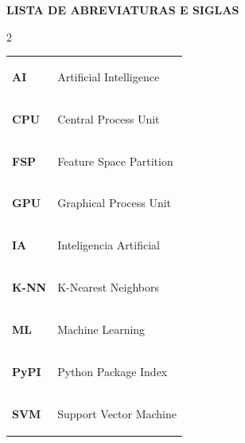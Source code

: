 \newpage
\thispagestyle{empty}
\begin{center}
\textbf{\uppercase{Lista de Abreviaturas e Siglas}}
\end{center}
\vspace{0.5cm}

\begin{spacing}{2}

\begin{longtable}[l]{ l l }
\hypertarget{sigla:AI}{\textbf{AI}}&Artificial Intelligence\\
\hypertarget{sigla:CPU}{\textbf{CPU}}&Central Process Unit\\
\hypertarget{sigla:FSP}{\textbf{FSP}}&Feature Space Partition\\
\hypertarget{sigla:GPU}{\textbf{GPU}}&Graphical Process Unit\\
\hypertarget{sigla:IA}{\textbf{IA}}&Inteligencia Artificial\\
\hypertarget{sigla:KNN}{\textbf{K-NN}}&K-Nearest Neighbors\\
\hypertarget{sigla:ML}{\textbf{ML}}&Machine Learning\\
\hypertarget{sigla:PyPI}{\textbf{PyPI}}&Python Package Index\\
\hypertarget{sigla:SVM}{\textbf{SVM}}&Support Vector Machine
\end{longtable}
{\addtocounter{table}{-1}}

\end{spacing}
